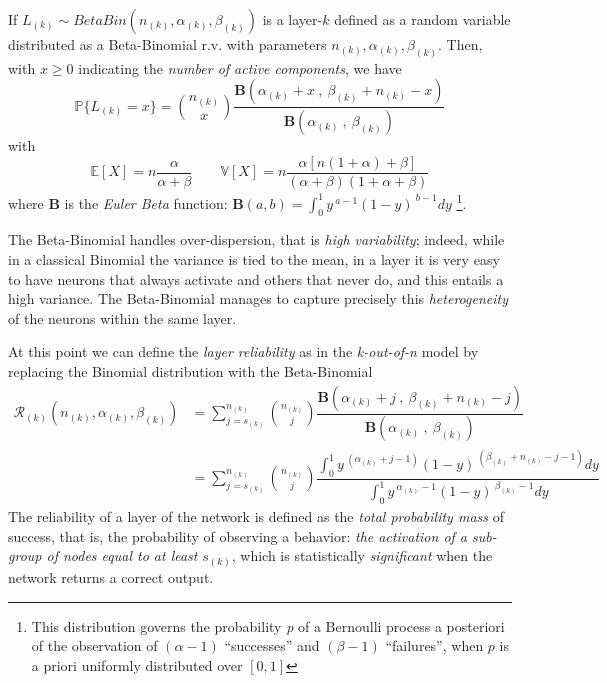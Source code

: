 \documentclass[10pt]{article} %
\begin{document}
If $L_{(k)}\sim BetaBin(n_{(k)},\alpha_{(k)},\beta_{(k)})$ is a layer-$k$ defined as a random variable distributed as a Beta-Binomial r.v. with parameters $n_{(k)},\alpha_{(k)},\beta_{(k)}$. Then, with $x \ge 0$ indicating the \textit{number of active components}, we have
\begin{equation}\label{BetaBin}
    \mathbb{P}\{L_{(k)} = x\} = \binom{n_{(k)}}{x}\dfrac{\textbf{B}(\alpha_{(k)}+x\ ,\ \beta_{(k)}+n_{(k)}-x)}{\textbf{B}(\alpha_{(k)}\ ,\ \beta_{(k)})}
\end{equation}
with
\begin{equation}
    \mathbb{E}[X] = n\dfrac{\alpha}{\alpha+\beta} \qquad 
    \mathbb{V}[X] = n\dfrac{\alpha[n(1+\alpha)+\beta]}{(\alpha+\beta)(1+\alpha+\beta)}
\end{equation}
where \textbf{B} is the \textit{Euler Beta} function:
$\textbf{B}(a, b) = \int_{0}^{1} y^{\ a-1}(1-y)^{\ b-1} dy$ \footnote{This distribution governs the probability 
\textit{p} of a Bernoulli process a posteriori of the observation of $(\alpha-1)$ ``successes'' and $(\beta-1)$ ``failures'', when $p$ is a priori uniformly distributed over $[0,1]$}.

The Beta-Binomial handles over-dispersion, that is \textit{high variability}; indeed, while in a classical Binomial the variance is tied to the mean, in a layer it is very easy to have neurons that always activate and others that never do, and this entails a high variance. The Beta-Binomial manages to capture precisely this \textit{heterogeneity} of the neurons within the same layer.

At this point we can define the \textit{layer reliability} as in the \textit{k-out-of-n} model by replacing the Binomial distribution with the Beta-Binomial
\begin{align}\label{Affidabilità Layer}
    \mathcal{R}_{(k)}(n_{(k)},\alpha_{(k)}, \beta_{(k)}) &= \sum_{j=s_{(k)}}^{n_{(k)}} \binom{n_{(k)}}{j}\dfrac{\textbf{B}(\alpha_{(k)}+j\ ,\ \beta_{(k)}+n_{(k)}-j)}{\textbf{B}(\alpha_{(k)}\ ,\ \beta_{(k)})}\\
    &=\sum_{j=s_{(k)}}^{n_{(k)}} \binom{n_{(k)}}{j}\dfrac{\int_{0}^{1} y^{\ (\alpha_{(k)}+j-1)}(1-y)^{\ (\beta_{(k)}+n_{(k)}-j-1)} dy}{\int_{0}^{1} y^{\ \alpha_{(k)}-1}(1-y)^{\ \beta_{(k)}-1} dy}
\end{align}
The reliability of a layer of the network is defined as the \textit{total probability mass} of success, that is, the probability of observing a behavior: \textit{the activation of a sub-group of nodes equal to at least} $s_{(k)}$, which is statistically \textit{significant} when the network returns a correct output.
\end{document}
